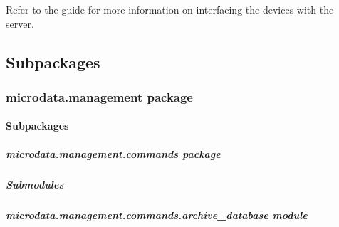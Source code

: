 \documentclass[letterpaper,10pt,english]{sphinxmanual}
\begin{document}
Refer to the {\hyperref[getting-started:getting-started]{\emph{}}} guide for more information on interfacing the devices with the server.


\subsection{Subpackages}
\label{modules/microdata:subpackages}

\subsubsection{microdata.management package}
\label{modules/microdata.management:microdata-management-package}\label{modules/microdata.management::doc}

\paragraph{Subpackages}
\label{modules/microdata.management:subpackages}

\subparagraph{microdata.management.commands package}
\label{modules/microdata.management.commands::doc}\label{modules/microdata.management.commands:microdata-management-commands-package}

\subparagraph{Submodules}
\label{modules/microdata.management.commands:submodules}

\subparagraph{microdata.management.commands.archive\_database module}
\label{modules/microdata.management.commands:microdata-management-commands-archive-database-module}\label{modules/microdata.management.commands:module-microdata.management.commands.archive_database}
\end{document}
